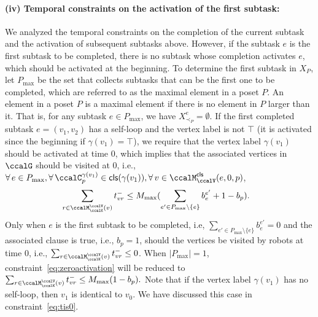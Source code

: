 \documentclass[Afour,sageh,times]{sagej}
\newcommand{\clause}[1]{\mathsf{cls}(#1)}
\begin{document}
{{{{{\paragraph{(iv) Temporal constraints on the activation of the first subtask:}
We analyzed the temporal constraints on the completion of the current subtask and the activation of subsequent subtasks above. However, if the subtask $e$ is the first subtask to be completed, there is no subtask whose completion activates $e$, which should be activated at the beginning. To determine the first subtask in $X_P$,  let $P_{\text{max}}$ be the set that collects subtasks that can be the first one to be completed, which are referred to as the maximal element in a poset $P$. An element in a poset $P$ is a maximal element if there is no element in $P$ larger than it. That is, for  any subtask  $e \in P_{\text{max}}$, we have $X_{\prec_P}^e = \emptyset$. If the first completed subtask $e = (v_1 ,v_2)$ has a self-loop and the vertex label is not $\top$ (it is activated since the beginning if $\gamma(v_1)=\top$), we require that the vertex label $\gamma(v_1)$ should be activated at time 0, which implies that the associated vertices in $\ccalG$ should be visited at 0,   i.e., $\forall\, e \in P_{\text{max}}, \forall\, \ccalC_p^{\gamma(v_1)} \in \clause{\gamma(v_1)}, \forall \,v \in \ccalM^\mathsf{cls}_\ccalV(e,0,p)$,
\begin{align}\label{eq:zeroactivation}
  & \sum_{r\in \ccalM^\ccalV_{\ccalK}(v)} t_{vr}^-  \leq M_{\text{max}} (\sum_{e' \in P_{\text{max}}\setminus \{e\}  } {b}_{e}^{e'} + 1- b_p).
\end{align}
Only when $e$ is the first subtask to be completed, i.e, $\sum_{e' \in P_{\text{max}}\setminus \{e\}  } {b}_{e}^{e'}=0$ and the associated clause is true, i.e., $b_p=1$, should the vertices be visited by robots at time 0, i.e., $\sum_{r\in \ccalM^\ccalV_{\ccalK}(v)} t_{vr}^-  \leq 0$. When $|P_{\text{max}}|=1$, constraint~\eqref{eq:zeroactivation} will be reduced to  $ \sum_{r\in \ccalM^\ccalV_{\ccalK}(v)} t_{vr}^-  \leq M_{\text{max}} (1- b_p).$ Note that if the vertex label $\gamma(v_1)$ has no self-loop, then $v_1$ is identical to $v_0$. We have discussed  this case in constraint~\eqref{eq:tis0}.


}}}}}
\end{document}
